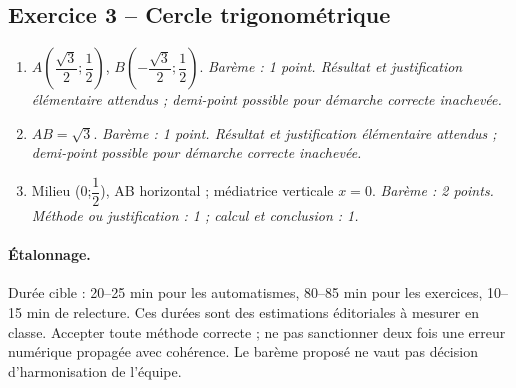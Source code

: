 \subsection*{Exercice 3 -- Cercle trigonométrique}
\begin{enumerate}
\item $A(\dfrac{\sqrt 3}{2};\dfrac{1}{2})$, $B(-\dfrac{\sqrt 3}{2};\dfrac{1}{2})$. \textit{Barème : 1 point. Résultat et justification élémentaire attendus ; demi-point possible pour démarche correcte inachevée.}
\item $AB=\sqrt3$. \textit{Barème : 1 point. Résultat et justification élémentaire attendus ; demi-point possible pour démarche correcte inachevée.}
\item Milieu (0;$\dfrac{1}{2}$), AB horizontal ; médiatrice verticale $x=0$. \textit{Barème : 2 points. Méthode ou justification : 1 ; calcul et conclusion : 1.}
\end{enumerate}
\paragraph{Étalonnage.} Durée cible : 20–25 min pour les automatismes, 80–85 min pour les exercices, 10–15 min de relecture. Ces durées sont des estimations éditoriales à mesurer en classe. Accepter toute méthode correcte ; ne pas sanctionner deux fois une erreur numérique propagée avec cohérence. Le barème proposé ne vaut pas décision d’harmonisation de l’équipe.
